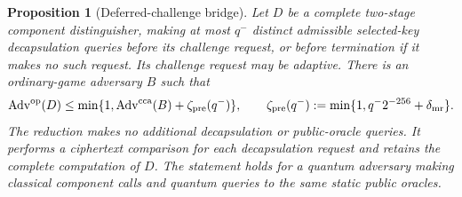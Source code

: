 \documentclass[pdflatex]{sn-jnl}
\theoremstyle{thmstyleone}
\newtheorem{proposition}[theorem]{Proposition}
\theoremstyle{thmstylethree}
\theoremstyle{thmstyletwo}
\begin{document}
\begin{proposition}[Deferred-challenge bridge]
\label{prop:kem-deferred-challenge}
Let $D$ be a complete two-stage component distinguisher, making at most
$q^-$ distinct admissible selected-key decapsulation queries before its
challenge request, or before termination if it makes no such request.
Its challenge request may be adaptive. There is an ordinary-game
adversary $B$ such that
\begin{equation}
 \operatorname{Adv}^{\rm op}(D)
 \le \min\{1,\operatorname{Adv}^{\rm cca}(B)
                 +\zeta_{\rm pre}(q^-)\},
 \qquad
 \zeta_{\rm pre}(q^-)
 :=\min\{1,q^-2^{-256}+\delta_{\rm mr}\}.
 \label{eq:kem-deferred-bridge}
\end{equation}
The reduction makes no additional decapsulation or public-oracle queries.
It performs a ciphertext comparison for each decapsulation request and
retains the complete computation of $D$. The statement holds for a
quantum adversary making classical component calls and quantum queries
to the same static public oracles.
\end{proposition}
\end{document}
